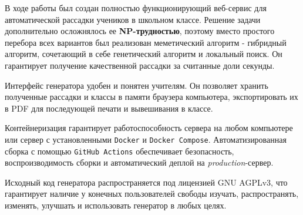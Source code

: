 \documentclass[12pt,a4paper]{extarticle} %
\begin{document}
	В ходе работы был создан полностью функционирующий веб-сервис для автоматической рассадки учеников в школьном классе. Решение задачи дополнительно осложнялось ее \textbf{NP-трудностью}, поэтому вместо простого перебора всех вариантов был реализован меметический алгоритм - гибридный алгоритм, сочетающий в себе генетический алгоритм и локальный поиск. Он гарантирует получение качественной рассадки за считанные доли секунды.
	
	Интерфейс генератора удобен и понятен учителям. Он позволяет хранить полученные рассадки и классы в памяти браузера компьютера, экспортировать их в PDF для последующей печати и вывешивания в классе.
	
	Контейнеризация гарантирует работоспособность сервера на любом компьютере или сервер с установленными \texttt{Docker} и \texttt{Docker Compose}. Автоматизированная сборка с помощью \texttt{GitHub Actions} обеспечивает безопасность, воспроизводимость сборки и автоматический деплой на \textit{production}-сервер.
	
	Исходный код генератора распространяется под лицензией GNU AGPLv3, что гарантирует наличие у конечных пользователей свободы изучать, распространять, изменять, улучшать и использовать генератор в любых целях.
	
	\newpage
	
	
	
	
	
	\newpage
	\appendix
	\setcounter{section}{0}
	\renewcommand{\thesection}{\arabic{section}}
	
	\titleformat{\section}{\normalfont\Large\bfseries\centering}{Приложение~\thesection. }{0pt}{}
	
	\makeatletter
	\newcommand{\appsection}[1]{
		\refstepcounter{section}
		\section*{Приложение~\thesection. #1} %
		\addcontentsline{toc}{section}{Приложение~\thesection. #1} %
	}
	\makeatother
	
\end{document}
